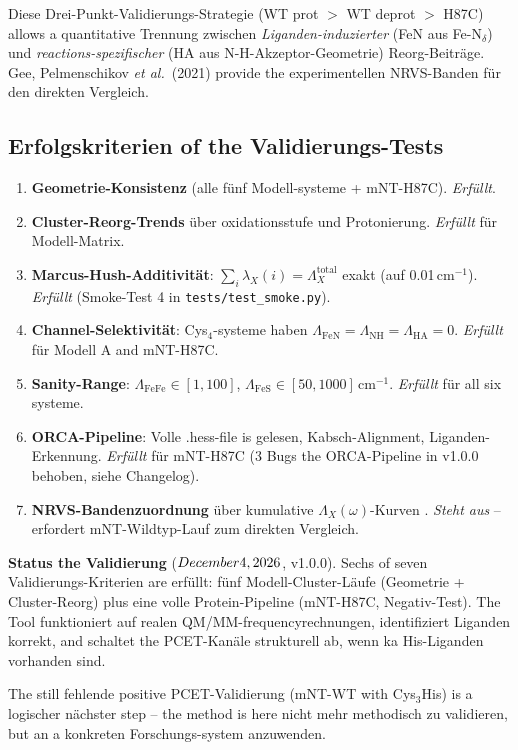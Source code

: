\documentclass[11pt,a4paper,twoside]{article}
\theoremstyle{remark}
\begin{document}
Diese Drei-Punkt-Validierungs-Strategie (WT prot $>$ WT deprot
$>$ H87C) allows a quantitative Trennung zwischen
\emph{Liganden-induzierter} (FeN aus Fe-N$_\delta$) und
\emph{reactions-spezifischer} (HA aus N-H-Akzeptor-Geometrie)
Reorg-Beitr\"age. Gee, Pelmenschikov \emph{et al.}\ (2021)
\cite{Gee2021} provide the experimentellen NRVS-Banden f\"ur den
direkten Vergleich.

\subsection{Erfolgskriterien of the Validierungs-Tests}
\label{sec:val-erfolgskriterien}

\begin{enumerate}
  \item \textbf{Geometrie-Konsistenz} (alle f\"unf Modell-systeme +
        mNT-H87C). \emph{Erf\"ullt}.
  \item \textbf{Cluster-Reorg-Trends} \"uber oxidationsstufe und
        Protonierung. \emph{Erf\"ullt} f\"ur Modell-Matrix.
  \item \textbf{Marcus-Hush-Additivit\"at}: $\sum_i \lambda_X(i) =
        \Lambda_X^\text{total}$ exakt (auf 0.01\,cm$^{-1}$).
        \emph{Erf\"ullt} (Smoke-Test 4 in \texttt{tests/test\_smoke.py}).
  \item \textbf{Channel-Selektivit\"at}: Cys$_4$-systeme haben
        $\Lambda_\text{FeN} = \Lambda_\text{NH} = \Lambda_\text{HA} = 0$.
        \emph{Erf\"ullt} f\"ur Modell A and mNT-H87C.
  \item \textbf{Sanity-Range}: $\Lambda_\text{FeFe} \in [1, 100]$,
        $\Lambda_\text{FeS} \in [50, 1000]$\,cm$^{-1}$. \emph{Erf\"ullt}
        f\"ur all six systeme.
  \item \textbf{ORCA-Pipeline}: Volle .hess-file is gelesen,
        Kabsch-Alignment, Liganden-Erkennung. \emph{Erf\"ullt} f\"ur
        mNT-H87C (3 Bugs the ORCA-Pipeline in v1.0.0 behoben, siehe Changelog).
  \item \textbf{NRVS-Bandenzuordnung} \"uber kumulative
        $\Lambda_X(\omega)$-Kurven \cite{Gee2021,Wang2025}.
        \emph{Steht aus} -- erfordert mNT-Wildtyp-Lauf zum
        direkten Vergleich.
\end{enumerate}

\begin{infobox}
\textbf{Status the Validierung} ($\today$, v1.0.0).
Sechs of seven Validierungs-Kriterien are erf\"ullt: f\"unf
Modell-Cluster-L\"aufe (Geometrie + Cluster-Reorg) plus eine
volle Protein-Pipeline (mNT-H87C, Negativ-Test). The Tool
funktioniert auf realen QM/MM-frequencyrechnungen, identifiziert
Liganden korrekt, and schaltet the PCET-Kan\"ale strukturell ab,
wenn ka His-Liganden vorhanden sind.

The still fehlende positive PCET-Validierung (mNT-WT with Cys$_3$His)
is a logischer n\"achster step -- the method is here nicht
mehr methodisch zu validieren, but an a konkreten
Forschungs-system anzuwenden.
\end{infobox}
\end{document}
